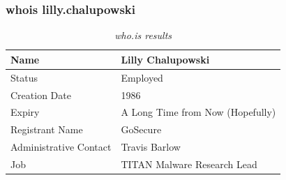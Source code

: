 \documentclass[aspectratio=169]{beamer}
\begin{document}
{%
\begin{frame}
  \frametitle{whois lilly.chalupowski}
  \begin{table}
    \caption{\textit{who.is results}}
    \begin{tabularx}{\textwidth}{|X|X|}
      \hline
      Name & Lilly Chalupowski \\
      \hline
      Status & Employed \\
      \hline
      Creation Date & 1986 \\
      \hline
      Expiry & A Long Time from Now (Hopefully)\\
      \hline
      Registrant Name & GoSecure \\
      \hline
      Administrative Contact & Travis Barlow \\
      \hline
      Job & TITAN Malware Research Lead \\
      \hline
    \end{tabularx}
  \end{table}
\end{frame}
}
\end{document}
